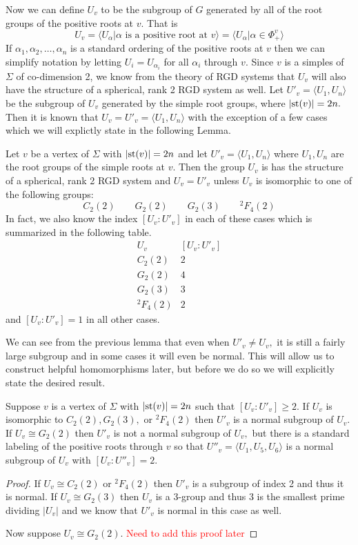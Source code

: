 \documentclass[class=book, crop=false,12 pt]{standalone}
\begin{document}
Now we can define $U_v$ to be the subgroup of $G$ generated by all of the root groups of the positive roots at $v.$ That is
\[
U_v=\langle U_\alpha|\alpha \text{ is a positive root at }v\rangle=\langle U_\alpha|\alpha\in \Phi_+^v\rangle
\]
If $\alpha_1,\alpha_2,\dots,\alpha_n$ is a standard ordering of the positive roots at $v$ then we can simplify notation by letting $U_i=U_{\alpha_i}$ for all $\alpha_i$ through $v.$ Since $v$ is a simples of $\Sigma$ of co-dimension 2, we know from the theory of RGD systems that $U_v$ will also have the structure of a spherical, rank 2 RGD system as well. Let $U'_v=\langle U_1,U_n\rangle$ be the subgroup of $U_v$ generated by the simple root groups, where $|\mathrm{st}(v)|=2n.$ Then it is known that $U_v=U'_v=\langle U_1,U_n\rangle$ with the exception of a few cases which we will explictly state in the following Lemma.

\begin{lemma}
	\label{lem:index}
	Let $v$ be a vertex of $\Sigma$ with $|\mathrm{st}(v)|=2n$ and let $U'_v=\langle U_1,U_n\rangle$ where $U_1,U_n$ are the root groups of the simple roots at $v.$ Then the group $U_v$ is has the structure of a spherical, rank 2 RGD system and $U_v=U'_v$ unless $U_v$ is isomorphic to one of the following groups:
	\[
		C_2(2)\qquad G_2(2) \qquad G_2(3) \qquad {}^2F_4(2)
	\]
	In fact, we also know the index $[U_v:U'_v]$ in each of these cases which is summarized in the following table.
	\[
		\begin{array}{c|c}
			U_v&[U_v:U'_v]\\\hline
			C_2(2)&2\\
			G_2(2)&4\\
			G_2(3)&3\\
			{}^2F_4(2)&2
		\end{array}
	\]
	and $[U_v:U'_v]=1$ in all other cases.
\end{lemma}

We can see from the previous lemma that even when $U'_v\neq U_v,$ it is still a fairly large subgroup and in some cases it will even be normal. This will allow us to construct helpful homomorphisms later, but before we do so we will explicitly state the desired result.

\begin{lemma}
	\label{lem:normal}
	Suppose $v$ is a vertex of $\Sigma$ with $|\mathrm{st}(v)|=2n$ such that $[U_v:U'_v]\ge 2.$ If $U_v$ is isomorphic to $C_2(2), G_2(3),$ or ${}^2F_4(2)$ then $U'_v$ is a normal subgroup of $U_v.$ If $U_v\cong G_2(2)$ then $U'_v$ is not a normal subgroup of $U_v,$ but there is a standard labeling of the positive roots through $v$ so that $U''_v=\langle U_{1},U_{5},U_{6}\rangle$ is a normal subgroup of $U_v$ with $[U_v:U''_v]=2.$
\end{lemma}
\begin{proof}
	If $U_v\cong C_2(2)$ or ${}^2F_4(2)$ then $U'_v$ is a subgroup of index 2 and thus it is normal. If $U_v\cong G_2(3)$ then $U_v$ is a 3-group and thus $3$ is the smallest prime dividing $|U_v|$ and we know that $U'_v$ is normal in this case as well.

	Now suppose $U_v\cong G_2(2).$ \textcolor{red}{Need to add this proof later}
\end{proof}
\end{document}
